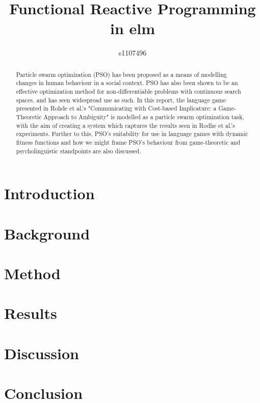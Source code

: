 \documentclass[12pt]{article}
\begin{document}
\title{Functional Reactive Programming in elm}
\author{s1107496}

\maketitle

\begin{abstract}
Particle swarm optimization (PSO) has been proposed as a means of modelling changes in human behaviour in a social context. PSO has also been shown to be an effective optimization method for non-differentiable problems with continuous search spaces, and has seen widespread use as such. In this report, the language game presented in Rohde et al.'s "Communicating with Cost-based Implicature: a Game-Theoretic Approach to Ambiguity" is modelled as a particle swarm optimization task, with the aim of creating a system which captures the results seen in Rodhe et al.'s experiments. Further to this, PSO's suitability for use in language games with dynamic fitness functions and how we might frame PSO's behaviour from game-theoretic and psycholinguistic standpoints are also discussed.
\end{abstract}


\section{Introduction}

\section{Background}

\section{Method}

\section{Results}

\section{Discussion}

\section{Conclusion}
\end{document}
